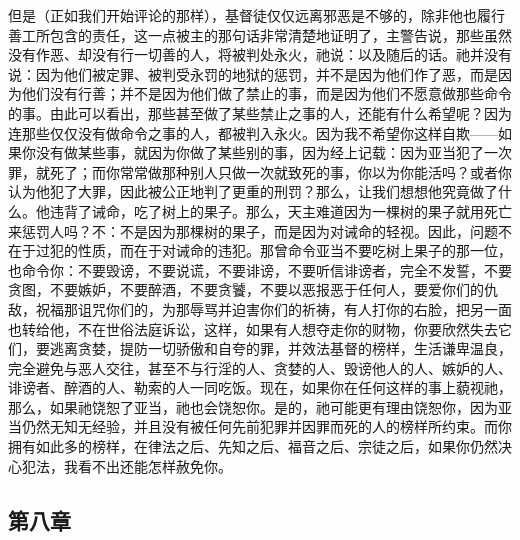但是（正如我们开始评论的那样），基督徒仅仅远离邪恶是不够的，除非他也履行善工所包含的责任，这一点被主的那句话非常清楚地证明了，主警告说，那些虽然没有作恶、却没有行一切善的人，将被判处永火，祂说：以及随后的话。祂并没有说：因为他们被定罪、被判受永罚的地狱的惩罚，并不是因为他们作了恶，而是因为他们没有行善；并不是因为他们做了禁止的事，而是因为他们不愿意做那些命令的事。由此可以看出，那些甚至做了某些禁止之事的人，还能有什么希望呢？因为连那些仅仅没有做命令之事的人，都被判入永火。因为我不希望你这样自欺——如果你没有做某些事，就因为你做了某些别的事，因为经上记载：因为亚当犯了一次罪，就死了；而你常常做那种别人只做一次就致死的事，你以为你能活吗？或者你认为他犯了大罪，因此被公正地判了更重的刑罚？那么，让我们想想他究竟做了什么。他违背了诫命，吃了树上的果子。那么，天主难道因为一棵树的果子就用死亡来惩罚人吗？不：不是因为那棵树的果子，而是因为对诫命的轻视。因此，问题不在于过犯的性质，而在于对诫命的违犯。那曾命令亚当不要吃树上果子的那一位，也命令你：不要毁谤，不要说谎，不要诽谤，不要听信诽谤者，完全不发誓，不要贪图，不要嫉妒，不要醉酒，不要贪饕，不要以恶报恶于任何人，要爱你们的仇敌，祝福那诅咒你们的，为那辱骂并迫害你们的祈祷，有人打你的右脸，把另一面也转给他，不在世俗法庭诉讼，这样，如果有人想夺走你的财物，你要欣然失去它们，要逃离贪婪，提防一切骄傲和自夸的罪，并效法基督的榜样，生活谦卑温良，完全避免与恶人交往，甚至不与行淫的人、贪婪的人、毁谤他人的人、嫉妒的人、诽谤者、醉酒的人、勒索的人一同吃饭。现在，如果你在任何这样的事上藐视祂，那么，如果祂饶恕了亚当，祂也会饶恕你。是的，祂可能更有理由饶恕你，因为亚当仍然无知无经验，并且没有被任何先前犯罪并因罪而死的人的榜样所约束。而你拥有如此多的榜样，在律法之后、先知之后、福音之后、宗徒之后，如果你仍然决心犯法，我看不出还能怎样赦免你。\par


\subsection{第八章}

